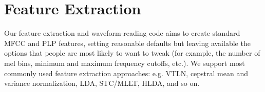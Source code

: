 \documentclass[10pt,conference,letterpaper]{IEEEtran}
\begin{document}



\section{Feature Extraction}
\label{sec:feats}
Our feature extraction and waveform-reading code aims to create standard MFCC 
and PLP features, setting reasonable defaults but leaving available the options 
that people are most likely to want to tweak (for example, the number of mel 
bins, minimum and maximum frequency cutoffs, etc.).  We support most commonly
used feature extraction approaches: e.g. VTLN, cepstral mean and variance normalization,
LDA, STC/MLLT, HLDA, and so on.

\end{document}
